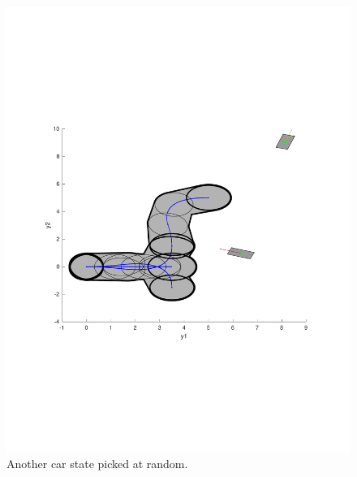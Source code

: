 \begin{figure}
  \includegraphics[scale=.5]{figures/rrtfunnel/modified-euclidean-distance-closest-funnel3}
  \caption{Another car state picked at random.}
\end{figure}

